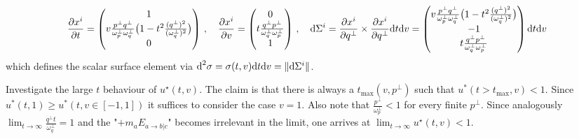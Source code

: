 \begin{equation}
    \frac{\partial x^i}{\partial t}=\begin{pmatrix}
    1\\
    v\frac{p^\perp q^\perp}{\omega_p^\perp\omega_q^\perp}\big(1-t^2\frac{(q^\perp)^2}{(\omega_q^\perp)^2}\big)\\
    0
    \end{pmatrix}\,,\quad
    \frac{\partial x^i}{\partial v}=\begin{pmatrix}
        0\\
        t\frac{q^\perp p^\perp}{\omega_q^\perp\omega_p^\perp}\\
        1
    \end{pmatrix}\,,\quad
    \text{d}\Sigma^i=\frac{\partial x^i}{\partial q^\perp}\times \frac{\partial x^i}{\partial q^\perp}\text{d} t\text{d} v=\begin{pmatrix}
        v\frac{p^\perp q^\perp}{\omega_p^\perp\omega_q^\perp}\big(1-t^2\frac{(q^\perp)^2}{(\omega_q^\perp)^2}\big)\\
        -1\\
        t\frac{q^\perp p^\perp}{\omega_q^\perp\omega_p^\perp}
    \end{pmatrix}\text{d} t\text{d} v
\end{equation}
which defines the scalar surface element via $\text{d}^2\sigma=\sigma(t,v)\text{d} t\text{d} v=\Vert\text{d}\Sigma^i\Vert$.

Investigate the large $t$ behaviour of $u^\star(t,v)$. The claim is that there is always a $t_{\text{max}}(v,p^\perp)$ such that $u^*(t>t_{\text{max}},v)<1$. Since $u^*(t,1)\geq u^*(t,v\in[-1,1])$ it suffices to consider the case $v=1$. Also note that $\frac{p^\perp}{\omega_p^\perp}<1$ for every finite $p^\perp$. Since analogously $\lim_{t\to\infty}\frac{q^\perp t}{\omega_q^\perp}=1$ and the "$+m_aE_{a\rightarrow b\vert c}$" becomes irrelevant in the limit, one arrives at $\lim_{t\to\infty}u^\star(t,v)<1$.



